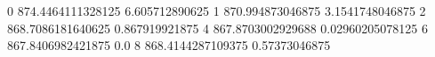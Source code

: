 0 874.4464111328125 6.605712890625
1 870.994873046875 3.1541748046875
2 868.7086181640625 0.867919921875
4 867.8703002929688 0.02960205078125
6 867.8406982421875 0.0
8 868.4144287109375 0.57373046875
